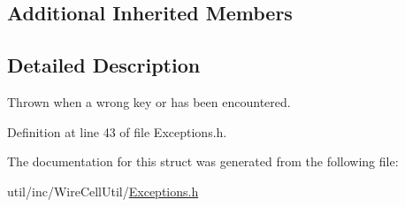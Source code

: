 \subsection*{Additional Inherited Members}


\subsection{Detailed Description}
Thrown when a wrong key or has been encountered. 

Definition at line 43 of file Exceptions.\+h.



The documentation for this struct was generated from the following file\+:\begin{DoxyCompactItemize}
\item 
util/inc/\+Wire\+Cell\+Util/\hyperlink{_exceptions_8h}{Exceptions.\+h}\end{DoxyCompactItemize}
